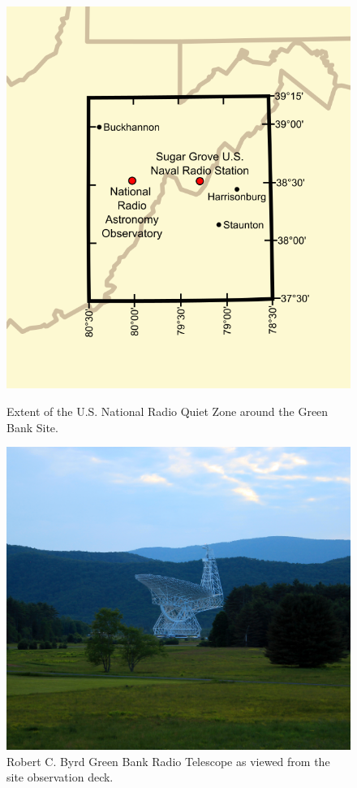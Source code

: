 \begin{figure}[htb]
\centering
\begin{minipage}[b]{0.47\textwidth}
\centering
\includegraphics[width=0.75\linewidth]{RFI_testing/figures/National_Radio_Quiet_Zone.png}
\caption{Extent of the U.S. National Radio Quiet Zone around the Green Bank Site.}
\label{Fig:nrqz}
\end{minipage}%
\begin{minipage}[b]{0.02\textwidth}
\hspace{1cm}
\end{minipage}%
\begin{minipage}[b]{0.47\textwidth}
\centering
\includegraphics[width=0.95\linewidth]{RFI_testing/figures/gbt_site.jpg}
\caption{Robert C. Byrd Green Bank Radio Telescope as viewed from the site observation deck. }
\label{Fig:gbt}
\end{minipage}
\end{figure}

